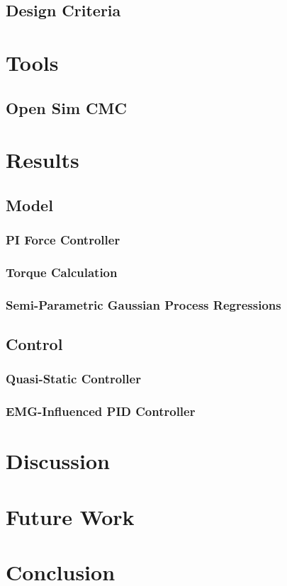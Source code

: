 \documentclass[a4paper,twoside,11pt]{report} %
\begin{document}
\section{Design Criteria}
\chapter{Tools}

\section{Open Sim CMC}

\cleardoublepage 
%
\cleardoublepage 

\cleardoublepage 

\chapter{Results}
\section{Model}
\subsection{PI Force Controller}
\subsection{Torque Calculation}
\subsection{Semi-Parametric Gaussian Process Regressions}
\section{Control}
\subsection{Quasi-Static Controller}
\subsection{EMG-Influenced PID Controller}
\chapter{Discussion}
\chapter{Future Work}
\chapter{Conclusion}


\cleardoublepage 

\printbibliography[heading=bibintoc,title={Bibliography}]
\cleardoublepage 
\appendix

\cleartoleftpage

\end{document}
